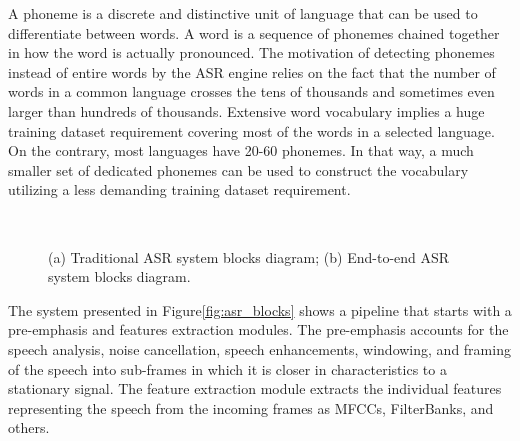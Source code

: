 A phoneme is a discrete and distinctive unit of language
that can be used to differentiate between words.
A word is a sequence of phonemes chained together in how the word is 
actually pronounced. 
The motivation of detecting phonemes instead of entire words by the ASR engine relies on the fact that the number of words in a common language crosses the tens of thousands and sometimes even larger than hundreds of thousands. 
Extensive word vocabulary implies a huge training dataset 
requirement covering most of the words in a selected language.
On the contrary, most languages have 20-60 phonemes\cite{Blust2013TerrorFT, dixon_1997}.
In that way, a much smaller set of dedicated phonemes can be used to construct the vocabulary utilizing a less demanding training dataset requirement.

\begin{figure}[H]
    \centering
    \\
    \caption{(a) Traditional ASR system blocks diagram;\;\;
        (b) End-to-end ASR system blocks diagram.}\label{fig:tr_e2e_asr_blocks} 
\end{figure}

The system presented in Figure\;\ref{fig:asr_blocks} 
shows a pipeline that starts with a pre-emphasis and features
extraction modules. 
The pre-emphasis accounts for the speech analysis, noise cancellation, speech enhancements, windowing, and framing of the speech into sub-frames in which it is closer in characteristics to a stationary signal.
The feature extraction module extracts the individual features representing the speech from the incoming frames as MFCCs, FilterBanks, and others.

